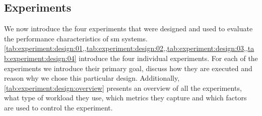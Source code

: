 \subsection{Experiments}
\label{sec:experiments:design:overview}

We now introduce the four experiments that were designed and used to evaluate the performance characteristics of \gls{sm} systems. \cref{tab:experiment:design:01,,tab:experiment:design:02,,tab:experiment:design:03,,tab:experiment:design:04} introduce the four individual experiments. For each of the experiments we introduce their primary goal, discuss how they are executed and reason why we chose this particular design. Additionally, \cref{tab:experiment:design:overview} presents an overview of all the experiments, what type of workload they use, which  metrics they capture and which factors  are used to control the experiment.









    
    
    

    
